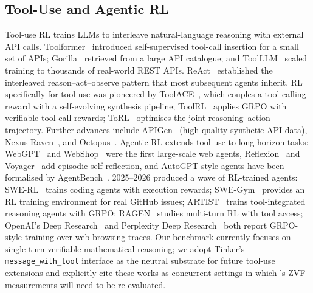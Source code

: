 \subsection{Tool-Use and Agentic RL}
\label{sec:related:tooluse}

Tool-use RL trains LLMs to interleave natural-language reasoning with external
API calls. Toolformer~\cite{schick2023toolformer} introduced self-supervised
tool-call insertion for a small set of APIs; Gorilla~\cite{patil2023gorilla}
retrieved from a large API catalogue; and ToolLLM~\cite{qin2024toolllm} scaled
training to thousands of real-world REST APIs. ReAct~\cite{yao2023react}
established the interleaved reason--act--observe pattern that most subsequent
agents inherit. RL specifically for tool use was pioneered by
ToolACE~\cite{liu2024toolace}, which couples a tool-calling reward with a
self-evolving synthesis pipeline; ToolRL~\cite{qian2025toolrl} applies GRPO
with verifiable tool-call rewards; ToRL~\cite{li2025torl} optimises the joint
reasoning--action trajectory. Further advances include
APIGen~\cite{lin2024apigen} (high-quality synthetic API data),
Nexus-Raven~\cite{nexusflow2024nexusraven}, and
Octopus~\cite{chen2024octopus}. Agentic RL extends tool use to long-horizon
tasks: WebGPT~\cite{nakano2021webgpt} and
WebShop~\cite{yao2022webshop} were the first large-scale web agents,
Reflexion~\cite{shinn2023reflexion} and Voyager~\cite{wang2023voyager} add
episodic self-reflection, and AutoGPT-style agents have been formalised by
AgentBench~\cite{liu2024agentbench}. 2025--2026 produced a wave of RL-trained
agents: SWE-RL~\cite{wei2025swerl} trains coding agents with execution
rewards; SWE-Gym~\cite{pan2025swegym} provides an RL training environment for
real GitHub issues; ARTIST~\cite{singh2025artist} trains tool-integrated
reasoning agents with GRPO; RAGEN~\cite{wang2025ragen} studies multi-turn
RL with tool access; OpenAI's Deep Research~\cite{openai2025deepresearch}
and Perplexity Deep Research~\cite{perplexity2025deepresearch} both report
GRPO-style training over web-browsing traces. Our benchmark currently focuses
on single-turn verifiable mathematical reasoning; we adopt Tinker's
\texttt{message\_with\_tool} interface as the neutral substrate for future
tool-use extensions and explicitly cite these works as concurrent settings in
which \ours{}'s ZVF measurements will need to be re-evaluated.

